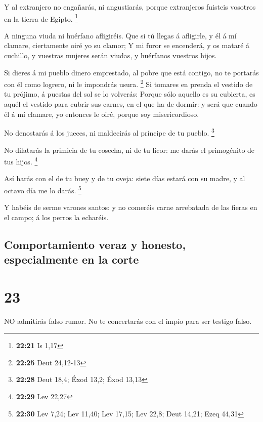  Y al extranjero no engañarás, ni angustiarás, porque
extranjeros fuisteis vosotros en la tierra de Egipto. \footnote{\textbf{22:21}
  Is 1,17}

 A ninguna viuda ni huérfano afligiréis.  Que
si tú llegas á afligirle, y él á mí clamare, ciertamente oiré yo su
clamor;  Y mi furor se encenderá, y os mataré á cuchillo, y
vuestras mujeres serán viudas, y huérfanos vuestros hijos.

 Si dieres á mi pueblo dinero emprestado, al pobre que está
contigo, no te portarás con él como logrero, ni le impondrás usura.
\footnote{\textbf{22:25} Deut 24,12-13}  Si tomares en
prenda el vestido de tu prójimo, á puestas del sol se lo volverás:
 Porque sólo aquello es su cubierta, es aquél el vestido
para cubrir sus carnes, en el que ha de dormir: y será que cuando él á
mí clamare, yo entonces le oiré, porque soy misericordioso.

 No denostarás á los jueces, ni maldecirás al príncipe de
tu pueblo. \footnote{\textbf{22:28} Deut 18,4; Éxod 13,2; Éxod 13,13}

 No dilatarás la primicia de tu cosecha, ni de tu licor: me
darás el primogénito de tus hijos. \footnote{\textbf{22:29} Lev 22,27}

 Así harás con el de tu buey y de tu oveja: siete días
estará con su madre, y al octavo día me lo darás. \footnote{\textbf{22:30}
  Lev 7,24; Lev 11,40; Lev 17,15; Lev 22,8; Deut 14,21; Ezeq 44,31}

 Y habéis de serme varones santos: y no comeréis carne
arrebatada de las fieras en el campo; á los perros la echaréis.

\hypertarget{comportamiento-veraz-y-honesto-especialmente-en-la-corte}{%
\subsection{Comportamiento veraz y honesto, especialmente en la
corte}\label{comportamiento-veraz-y-honesto-especialmente-en-la-corte}}

\hypertarget{section-22}{%
\section{23}\label{section-22}}

 NO admitirás falso rumor. No te concertarás con el impío
para ser testigo falso.

